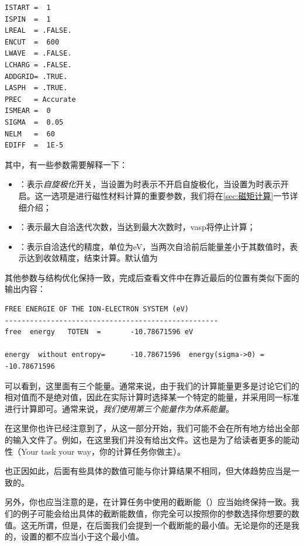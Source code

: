 \begin{lstlisting}[caption=INCAR]
ISTART =  1
ISPIN  =  1
LREAL  = .FALSE.
ENCUT  =  600
LWAVE  = .FALSE.
LCHARG = .FALSE.
ADDGRID= .TRUE.
LASPH  = .TRUE.
PREC   = Accurate
ISMEAR =  0
SIGMA  =  0.05
NELM   =  60
EDIFF  =  1E-5
\end{lstlisting}

其中，有一些参数需要解释一下：

\begin{itemize}
    \item {}：表示\emph{自旋极化}开关，当设置为时表示不开启自旋极化，当设置为时表示开启。这一选项是进行磁性材料计算的重要参数，我们将在\ref{sec:磁矩计算}一节详细介绍；
    \item {}：表示最大自洽迭代次数，当达到最大次数时，vasp将停止计算；
    \item {}：表示自洽迭代的精度，单位为eV，当两次自洽前后能量差小于其数值时，表示达到收敛精度，结束计算。默认值为
\end{itemize}

其他参数与结构优化保持一致，完成后查看文件中在靠近最后的位置有类似下面的输出内容：

\begin{lstlisting}[caption=OUTCAR]
FREE ENERGIE OF THE ION-ELECTRON SYSTEM (eV)
---------------------------------------------------
free  energy   TOTEN  =       -10.78671596 eV

energy  without entropy=      -10.78671596  energy(sigma->0) =      -10.78671596
\end{lstlisting}

可以看到，这里面有三个能量。通常来说，由于我们的计算能量更多是讨论它们的相对值而不是绝对值，因此在实际计算时选择某一个特定的能量，并采用同一标准进行计算即可。通常来说，\emph{我们使用第三个能量作为体系能量}。

\begin{attention}
    在这里你也许已经注意到了，从这一部分开始，我们可能不会在所有地方给出全部的输入文件了。例如，在这里我们并没有给出文件。这也是为了给读者更多的能动性（Your task your way，你的计算任务你做主）。
    
    也正因如此，后面有些具体的数值可能与你计算结果不相同，但大体趋势应当是一致的。

    另外，你也应当注意的是，在计算任务中使用的截断能（）应当始终保持一致。我们的例子可能会给出具体的截断能数值，你完全可以按照你的参数选择你想要的数值。这无所谓，但是，在后面我们会提到一个截断能的最小值。无论是你的还是我的，设置的都不应当小于这个最小值。
\end{attention}

